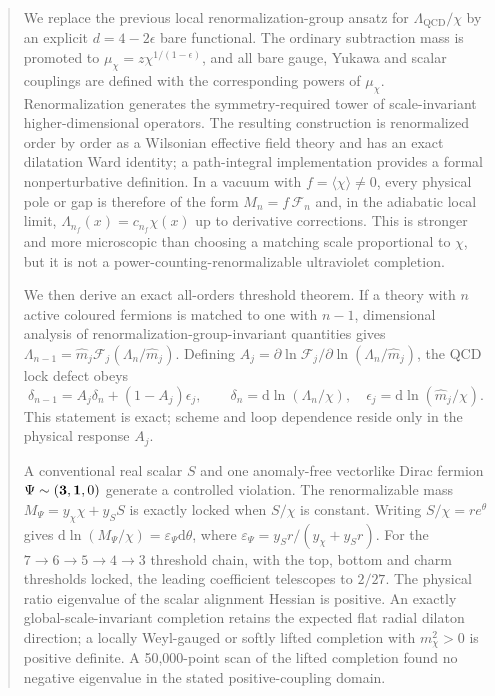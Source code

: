 \documentclass[11pt,a4paper]{article}
\newcommand{\dd}{\mathrm{d}}
\newcommand{\QCD}{\mathrm{QCD}}
\begin{document}
\begin{abstract}
We replace the previous local renormalization-group ansatz for $\Lambda_{\QCD}/\chi$ by an explicit $d=4-2\epsilon$ bare functional. The ordinary subtraction mass is promoted to $\mu_\chi=z\chi^{1/(1-\epsilon)}$, and all bare gauge, Yukawa and scalar couplings are defined with the corresponding powers of $\mu_\chi$. Renormalization generates the symmetry-required tower of scale-invariant higher-dimensional operators. The resulting construction is renormalized order by order as a Wilsonian effective field theory and has an exact dilatation Ward identity; a path-integral implementation provides a formal nonperturbative definition. In a vacuum with $f=\langle\chi\rangle\neq0$, every physical pole or gap is therefore of the form $M_n=f\,\mathcal F_n$ and, in the adiabatic local limit, $\Lambda_{n_f}(x)=c_{n_f}\chi(x)$ up to derivative corrections. This is stronger and more microscopic than choosing a matching scale proportional to $\chi$, but it is not a power-counting-renormalizable ultraviolet completion.

We then derive an exact all-orders threshold theorem. If a theory with $n$ active coloured fermions is matched to one with $n-1$, dimensional analysis of renormalization-group-invariant quantities gives $\Lambda_{n-1}=\widehat m_j\mathcal F_j(\Lambda_n/\widehat m_j)$. Defining $A_j=\partial\ln\mathcal F_j/\partial\ln(\Lambda_n/\widehat m_j)$, the QCD lock defect obeys
\[
\delta_{n-1}=A_j\delta_n+(1-A_j)\epsilon_j,
\qquad
\delta_n=\dd\ln(\Lambda_n/\chi),\quad
\epsilon_j=\dd\ln(\widehat m_j/\chi).
\]
This statement is exact; scheme and loop dependence reside only in the physical response $A_j$.

A conventional real scalar $S$ and one anomaly-free vectorlike Dirac fermion $\Psi\sim({\bf3},{\bf1},0)$ generate a controlled violation. The renormalizable mass $M_\Psi=y_\chi\chi+y_SS$ is exactly locked when $S/\chi$ is constant. Writing $S/\chi=r e^\theta$ gives $\dd\ln(M_\Psi/\chi)=\varepsilon_\Psi\dd\theta$, where $\varepsilon_\Psi=y_Sr/(y_\chi+y_Sr)$. For the $7\to6\to5\to4\to3$ threshold chain, with the top, bottom and charm thresholds locked, the leading coefficient telescopes to $2/27$. The physical ratio eigenvalue of the scalar alignment Hessian is positive. An exactly global-scale-invariant completion retains the expected flat radial dilaton direction; a locally Weyl-gauged or softly lifted completion with $m_\chi^2>0$ is positive definite. A 50,000-point scan of the lifted completion found no negative eigenvalue in the stated positive-coupling domain.


\end{abstract}
\end{document}
